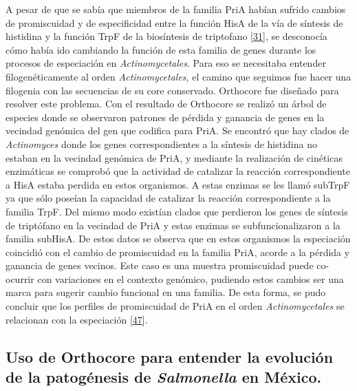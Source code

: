 \documentclass[12pt,twoside]{reedthesis}
\begin{document}
  A pesar de que se sabía que miembros de la familia PriA habían sufrido
  cambios de promiscuidad y de especificidad entre la función HisA de la
  vía de síntesis de histidina y la función TrpF de la biosíntesis de
  triptofano {[}\protect\hyperlink{ref-noda-garcia_evolution_2013}{31}{]},
  se desconocía cómo había ido cambiando la función de esta familia de
  genes durante los procesos de especiación en \emph{Actinomycetales}.
  Para eso se necesitaba entender filogenéticamente al orden
  \emph{Actinomycetales}, el camino que seguimos fue hacer una filogenia
  con las secuencias de su core conservado. Orthocore fue diseñado para
  resolver este problema. Con el resultado de Orthocore se realizó un
  árbol de especies donde se observaron patrones de pérdida y ganancia de
  genes en la vecindad genómica del gen que codifica para PriA. Se
  encontró que hay clados de \emph{Actinomyces} donde los genes
  correspondientes a la síntesis de histidina no estaban en la vecindad
  genómica de PriA, y mediante la realización de cinéticas enzimáticas se
  comprobó que la actividad de catalizar la reacción correspondiente a
  HisA estaba perdida en estos organismos. A estas enzimas se les llamó
  subTrpF ya que sólo poseían la capacidad de catalizar la reacción
  correspondiente a la familia TrpF. Del mismo modo existían clados que
  perdieron los genes de síntesis de triptófano en la vecindad de PriA y
  estas enzimas se subfuncionalizaron a la familia subHisA. De estos datos
  se observa que en estos organismos la especiación coincidió con el
  cambio de promiscuidad en la familia PriA, acorde a la pérdida y
  ganancia de genes vecinos. Este caso es una muestra promiscuidad puede
  co-ocurrir con variaciones en el contexto genómico, pudiendo estos
  cambios ser una marca para sugerir cambio funcional en una familia. De
  esta forma, se pudo concluir que los perfiles de promiscuidad de PriA en
  el orden \emph{Actinomycetales} se relacionan con la especiación
  {[}\protect\hyperlink{ref-juarez-vazquez_evolution_2017}{47}{]}.
  
  \subsection{\texorpdfstring{Uso de Orthocore para entender la evolución
  de la patogénesis de \emph{Salmonella} en
  México.}{Uso de Orthocore para entender la evolución de la patogénesis de Salmonella en México.}}\label{uso-de-orthocore-para-entender-la-evolucion-de-la-patogenesis-de-salmonella-en-mexico.}
  
\end{document}
